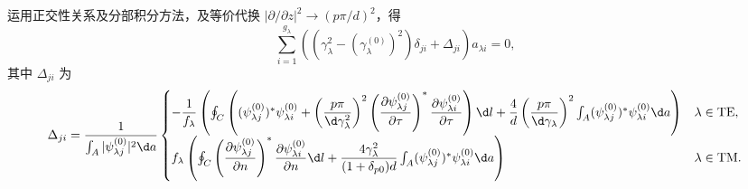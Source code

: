 运用正交性关系及分部积分方法，及等价代换 \(|\partial/\partial z|^2 \to (p\pi/d)^2\)，得
\begin{equation*}
	\sum_{i=1}^{g_{\lambda}} \left( \left( \gamma_{\lambda}^2 - (\gamma_{\lambda}^{(0)})^2 \right) \delta_{ji} + \Delta_{ji} \right) a_{\lambda i} = 0,
\end{equation*}
其中 \(\Delta_{ji}\) 为
\begin{equation*}
	\Delta_{ji} = \dfrac{1}{\int_A |\psi_{\lambda j}^{(0)}|^2 \d a} \begin{cases}
		-\dfrac{1}{f_{\lambda}} \left( \oint_C \left( (\psi_{\lambda j}^{(0)})^* \psi_{\lambda i}^{(0)} + \left( \dfrac{p\pi}{\d \gamma_{\lambda}^2} \right)^2 \left( \dfrac{\partial \psi_{\lambda j}^{(0)}}{\partial \tau} \right)^* \dfrac{\partial \psi_{\lambda i}^{(0)}}{\partial \tau} \right) \d l + \dfrac{4}{d} \left( \dfrac{p\pi}{\d \gamma_{\lambda}} \right)^2 \int_A (\psi_{\lambda j}^{(0)})^* \psi_{\lambda i}^{(0)} \d a \right) & \lambda \in \text{TE}, \\
		f_{\lambda} \left( \oint_C \left( \dfrac{\partial \psi_{\lambda j}^{(0)}}{\partial n} \right)^* \dfrac{\partial \psi_{\lambda i}^{(0)}}{\partial n} \d l + \dfrac{4 \gamma_{\lambda}^2}{(1+\delta_{p0}) d} \int_A (\psi_{\lambda j}^{(0)})^* \psi_{\lambda i}^{(0)} \d a \right)                                                                                                                                                           & \lambda \in \text{TM}.
	\end{cases}
\end{equation*}


